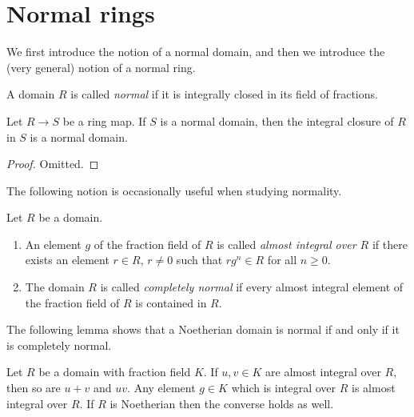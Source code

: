 \section{Normal rings}
\label{section-normal-rings}

\noindent
We first introduce the notion of a normal domain, and then we
introduce the (very general) notion of a normal ring.

\begin{definition}
\label{definition-domain-normal}
A domain $R$ is called {\it normal} if it is integrally
closed in its field of fractions.
\end{definition}

\begin{lemma}
\label{lemma-integral-closure-in-normal}
Let $R \to S$ be a ring map.
If $S$ is a normal domain, then the integral closure of $R$
in $S$ is a normal domain.
\end{lemma}

\begin{proof}
Omitted.
\end{proof}

\noindent
The following notion is occasionally useful when
studying normality.

\begin{definition}
\label{definition-almost-integral}
Let $R$ be a domain.
\begin{enumerate}
\item An element $g$ of the fraction
field of $R$ is called {\it almost integral over $R$}
if there exists an element $r \in R$, $r\not = 0$
such that $rg^n \in R$ for all $n \geq 0$.
\item The domain $R$ is called {\it completely normal} if every
almost integral element of the fraction field of $R$ is
contained in $R$.
\end{enumerate}
\end{definition}

\noindent
The following lemma shows that a Noetherian domain is normal
if and only if it is completely normal.

\begin{lemma}
\label{lemma-almost-integral}
Let $R$ be a domain with fraction field $K$.
If $u, v \in K$ are almost integral over $R$, then so are
$u + v$ and $uv$. Any element $g \in K$ which is integral over $R$
is almost integral over $R$. If $R$ is Noetherian
then the converse holds as well.
\end{lemma}

